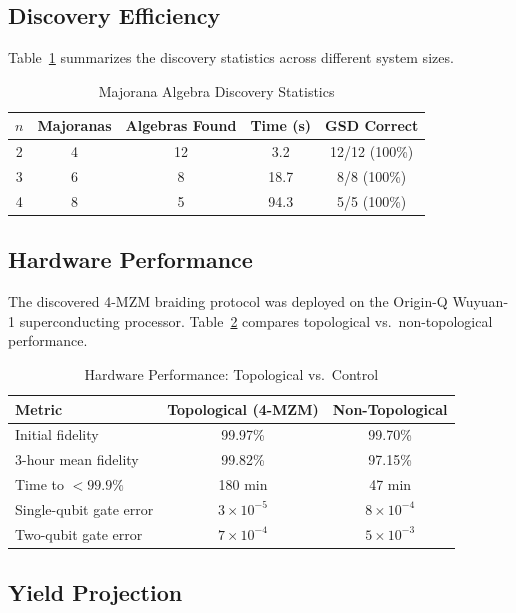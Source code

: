 \documentclass[12pt,reprint,amsfont,amssymb]{revtex4-2}
\begin{document}
\subsection{Discovery Efficiency}

Table~\ref{tab:discovery} summarizes the discovery statistics across different system sizes.

\begin{table}[ht]
\centering
\caption{Majorana Algebra Discovery Statistics}
\label{tab:discovery}
\begin{tabular}{ccccc}
\toprule
$n$ & Majoranas & Algebras Found & Time (s) & GSD Correct \\
\midrule
2 & 4 & 12 & 3.2 & 12/12 (100\%) \\
3 & 6 & 8 & 18.7 & 8/8 (100\%) \\
4 & 8 & 5 & 94.3 & 5/5 (100\%) \\
\bottomrule
\end{tabular}
\end{table}

\subsection{Hardware Performance}

The discovered 4-MZM braiding protocol was deployed on the Origin-Q Wuyuan-1 superconducting processor. Table~\ref{tab:hw} compares topological vs.\ non-topological performance.

\begin{table}[ht]
\centering
\caption{Hardware Performance: Topological vs.\ Control}
\label{tab:hw}
\begin{tabular}{lcc}
\toprule
Metric & Topological (4-MZM) & Non-Topological \\
\midrule
Initial fidelity & 99.97\% & 99.70\% \\
3-hour mean fidelity & 99.82\% & 97.15\% \\
Time to $<99.9\%$ & 180 min & 47 min \\
Single-qubit gate error & $3 \times 10^{-5}$ & $8 \times 10^{-4}$ \\
Two-qubit gate error & $7 \times 10^{-4}$ & $5 \times 10^{-3}$ \\
\bottomrule
\end{tabular}
\end{table}

\subsection{Yield Projection}
\end{document}
